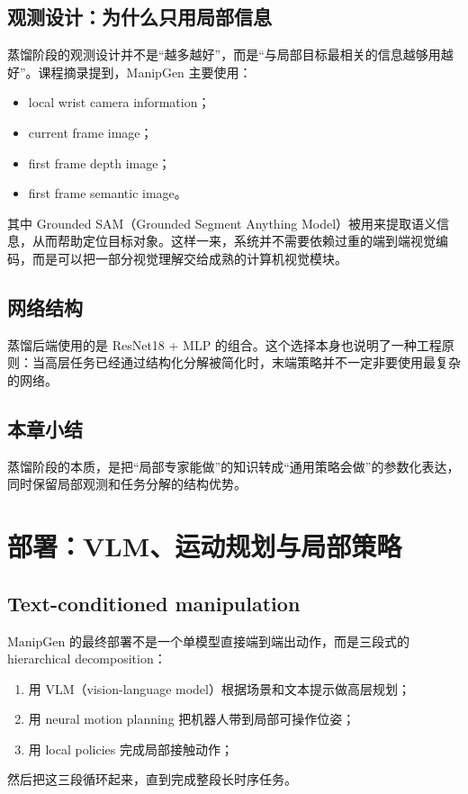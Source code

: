 \documentclass[a4paper]{article}
\begin{document}
\subsection{观测设计：为什么只用局部信息}

蒸馏阶段的观测设计并不是“越多越好”，而是“与局部目标最相关的信息越够用越好”。课程摘录提到，ManipGen 主要使用：
\begin{itemize}
  \item local wrist camera information；
  \item current frame image；
  \item first frame depth image；
  \item first frame semantic image。
\end{itemize}

其中 Grounded SAM（Grounded Segment Anything Model）被用来提取语义信息，从而帮助定位目标对象。这样一来，系统并不需要依赖过重的端到端视觉编码，而是可以把一部分视觉理解交给成熟的计算机视觉模块。

\subsection{网络结构}

蒸馏后端使用的是 ResNet18 + MLP 的组合。这个选择本身也说明了一种工程原则：当高层任务已经通过结构化分解被简化时，末端策略并不一定非要使用最复杂的网络。

\subsection{本章小结}

蒸馏阶段的本质，是把“局部专家能做”的知识转成“通用策略会做”的参数化表达，同时保留局部观测和任务分解的结构优势。

\section{部署：VLM、运动规划与局部策略}

\subsection{Text-conditioned manipulation}

ManipGen 的最终部署不是一个单模型直接端到端出动作，而是三段式的 hierarchical decomposition：
\begin{enumerate}
  \item 用 VLM（vision-language model）根据场景和文本提示做高层规划；
  \item 用 neural motion planning 把机器人带到局部可操作位姿；
  \item 用 local policies 完成局部接触动作；
\end{enumerate}
然后把这三段循环起来，直到完成整段长时序任务。
\end{document}
